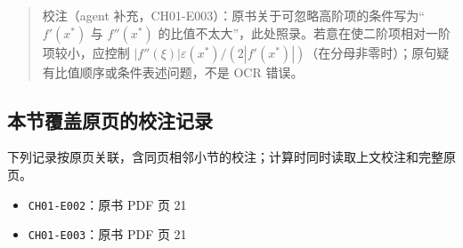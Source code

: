\documentclass[
  10pt,
  fontset=fandol]{ctexart}
\providecommand{\tightlist}{%
  \setlength{\itemsep}{0pt}\setlength{\parskip}{0pt}}
\begin{document}
\begin{quote}
校注（agent 补充，CH01-E003）：原书关于可忽略高阶项的条件写为``\(f'(x^*)\) 与 \(f''(x^*)\) 的比值不太大''，此处照录。若意在使二阶项相对一阶项较小，应控制 \(|f''(\xi)|\varepsilon(x^*)/(2|f'(x^*)|)\)（在分母非零时）；原句疑有比值顺序或条件表述问题，不是 OCR 错误。
\end{quote}

\subsection{本节覆盖原页的校注记录}\label{ux672cux8282ux8986ux76d6ux539fux9875ux7684ux6821ux6ce8ux8bb0ux5f55}

下列记录按原页关联，含同页相邻小节的校注；计算时同时读取上文校注和完整原页。

\begin{itemize}
\tightlist
\item
  \texttt{CH01-E002}：原书 PDF 页 21
\item
  \texttt{CH01-E003}：原书 PDF 页 21
\end{itemize}
\end{document}
